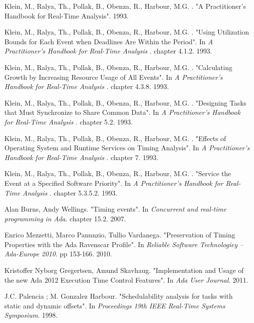 \documentclass{article}
\begin{document}
\begin{thebibliography}{1}
Klein, M., Ralya, Th., Pollak, B., Obenza, R., Harbour, M.G. .
\newblock "A Practitioner's Handbook for Real-Time Analysis". 1993.

Klein, M., Ralya, Th., Pollak, B., Obenza, R., Harbour, M.G. .
\newblock "Using Utilization Bounds for Each Event when Deadlines Are Within the Period".
\newblock In {\em A Practitioner's Handbook for Real-Time Analysis
}. chapter 4.1.2. 1993.

Klein, M., Ralya, Th., Pollak, B., Obenza, R., Harbour, M.G. .
\newblock "Calculating Growth by Increasing Resource Usage of All Events".
\newblock In {\em A Practitioner's Handbook for Real-Time Analysis
}. chapter 4.3.8. 1993.

Klein, M., Ralya, Th., Pollak, B., Obenza, R., Harbour, M.G. .
\newblock "Designing Tasks that Must Synchronize to Share Common Data".
\newblock In {\em A Practitioner's Handbook for Real-Time Analysis
}. chapter 5.2. 1993.

Klein, M., Ralya, Th., Pollak, B., Obenza, R., Harbour, M.G. .
\newblock "Effects of Operating System and Runtime Services on Timing Analysis".
\newblock In {\em A Practitioner's Handbook for Real-Time Analysis
}. chapter 7. 1993.

Klein, M., Ralya, Th., Pollak, B., Obenza, R., Harbour, M.G. .
\newblock "Service the Event at a Specified Software Priority".
\newblock In {\em A Practitioner's Handbook for Real-Time Analysis
}. chapter 5.3.5.2. 1993.

Alan Burns, Andy Wellings.
\newblock "Timing events".
\newblock In {\em Concurrent and real-time programming in Ada}. chapter 15.2. 2007.

Enrico Mezzetti, Marco Panunzio, Tullio Vardanega.
\newblock "Preservation of Timing Properties with the Ada Ravenscar Profile".
\newblock In {\em Reliable Software Technologiey – Ada-Europe 2010}. pp 153-166. 2010.

Kristoffer Nyborg Gregertsen, Amund Skavhaug.
\newblock "Implementation and Usage of the new Ada 2012 Execution Time Control Features".
\newblock In {\em Ada User Journal}. 2011.

J.C. Palencia ; M. Gonzalez Harbour.
\newblock "Schedulability analysis for tasks with static and dynamic offsets".
\newblock In {\em Proceedings 19th IEEE Real-Time Systems Symposium}. 1998.


\end{thebibliography}
\end{document}
